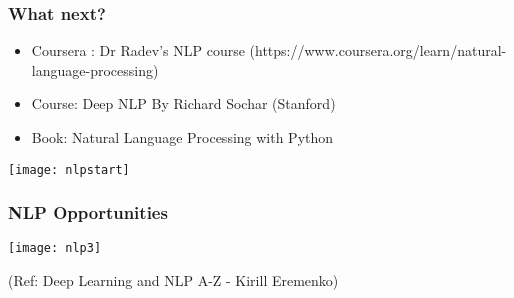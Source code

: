 \begin{frame}[fragile]\frametitle{What next?}

\begin{itemize}
\item Coursera : Dr Radev's NLP course (https://www.coursera.org/learn/natural-language-processing)
\item Course: Deep NLP By Richard Sochar (Stanford)
\item  Book: Natural Language Processing with Python
\end{itemize}

\begin{center}
\texttt{[image: nlpstart]}
\end{center}

\end{frame}

\begin{frame}[fragile]\frametitle{NLP Opportunities}
\begin{center}
\texttt{[image: nlp3]}

\tiny{(Ref: Deep Learning and NLP A-Z - Kirill Eremenko)}
\end{center}

\end{frame}